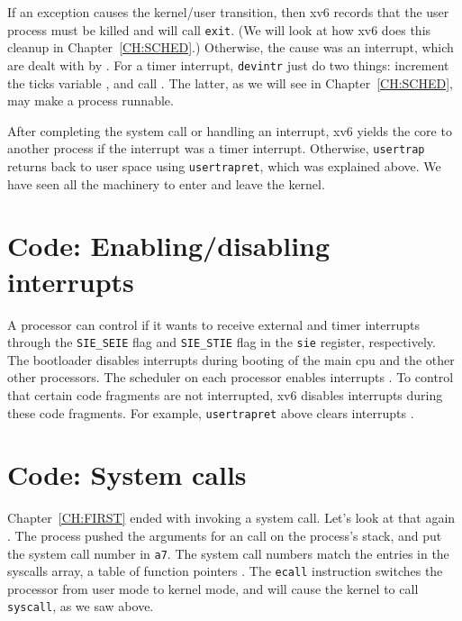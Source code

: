 If an exception causes the kernel/user transition, then xv6 records
that the user process must be killed and will call \lstinline{exit}.
(We will look at how xv6 does this cleanup in Chapter~\ref{CH:SCHED}.)
Otherwise, the cause was an interrupt, which are dealt with by
.  For a timer
interrupt, \lstinline{devintr} just do two things: increment the ticks
variable , and call
.  The latter, as
we will see in Chapter~\ref{CH:SCHED}, may make a process runnable.

After completing the system call or handling an interrupt, xv6 yields
the core to another process if the interrupt was a timer interrupt.
Otherwise, \lstinline{usertrap} returns back to user space using
\lstinline{usertrapret}, which was explained above.  We have seen all
the machinery to enter and leave the kernel.
 
\section{Code: Enabling/disabling interrupts}

A processor can control if it wants to receive external and timer
interrupts through the \lstinline{SIE_SEIE}
 flag and \lstinline{SIE_STIE}
 flag in the \texttt{sie}
register, respectively.  The bootloader disables interrupts during
booting of the main cpu and the other other processors.  The scheduler on
each processor enables interrupts .  To
control that certain code fragments are not interrupted, xv6 disables
interrupts during these code fragments.  For example,
\lstinline{usertrapret} above clears interrupts
.

\section{Code: System calls}

Chapter~\ref{CH:FIRST} ended with 
invoking a system call.
Let's look at that again
.
The process pushed the arguments
for an 
call on the process's stack, and put the
system call number in
\texttt{a7}.
The system call numbers match the entries in the syscalls array,
a table of function pointers
.
The \lstinline{ecall} instruction
switches the processor from user mode to kernel mode, and will
cause the kernel to call \lstinline{syscall}, as we saw above.

